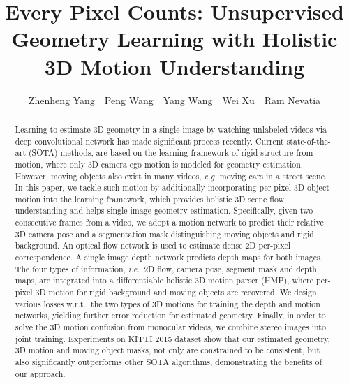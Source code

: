 \documentclass[runningheads]{llncs}
\makeatletter
\DeclareRobustCommand\onedot{\futurelet\@let@token\@onedot}
\def\onedot{\ifx\@let@token.\else.\null\fi\xspace}
\def\ie{\emph{i.e.}}
\def\wrt{w.r.t\onedot}
\makeatother
\begin{document}
\pagestyle{headings}
\mainmatter

\title{Every Pixel Counts: Unsupervised Geometry Learning with Holistic 3D Motion Understanding} 

\author{
Zhenheng Yang~~Peng Wang~~Yang Wang~~Wei Xu~~Ram Nevatia\\
}


\maketitle


\begin{abstract}
    Learning to estimate 3D geometry in a single image by watching unlabeled videos via deep convolutional network has made significant process recently. Current state-of-the-art (SOTA) methods, are based on the learning framework of rigid structure-from-motion, where only 3D camera ego motion is modeled for geometry estimation. 
    However, moving objects also exist in many videos, \textit{e.g.} moving cars in a street scene.
    In this paper, we tackle such motion by additionally incorporating per-pixel 3D object motion into the learning framework, which provides holistic 3D scene flow understanding and helps single image geometry estimation. 
    Specifically, given two consecutive frames from a video, we adopt a motion network to predict their relative 3D camera pose and a segmentation mask distinguishing moving objects and rigid background. An optical flow network is used to estimate dense 2D per-pixel correspondence. A single image depth network predicts depth maps for both images. 
    The four types of information,  \ie~2D flow, camera pose, segment mask and depth maps, are integrated into a differentiable holistic 3D motion parser (HMP), where per-pixel 3D motion for rigid background and moving objects are recovered. We design various losses \wrt the two types of 3D motions for training the depth and motion networks, yielding further error reduction for estimated geometry.
Finally, in order to solve the 3D motion confusion from monocular videos, we combine stereo images into joint training.
    Experiments on KITTI 2015 dataset show that our estimated geometry, 3D motion and moving object masks, not only are constrained to be consistent, but also significantly outperforms other SOTA algorithms, demonstrating the benefits of our approach.



   
\end{abstract}
\end{document}
